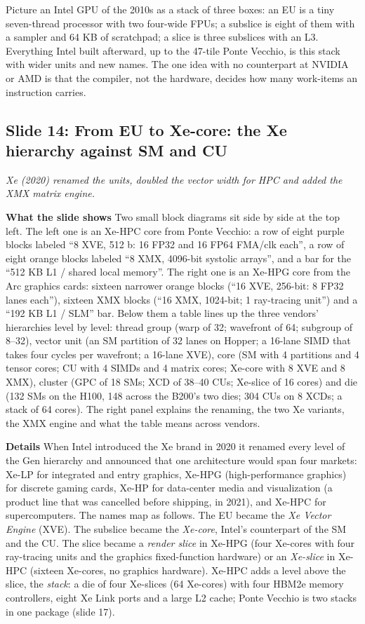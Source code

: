 \documentclass[11pt,letterpaper]{article}
\newcommand{\slide}[3]{%
  \subsection[Slide #1: #2]{Slide #1: #2}%
  {\color{muted}\itshape #3\par}\medskip}
\newcommand{\para}[1]{\medskip\noindent\textbf{#1}\quad}
\newenvironment{intuition}{\begin{tcolorbox}[intuitionbox]}{\end{tcolorbox}}
\begin{document}
\begin{intuition}
Picture an Intel GPU of the 2010s as a stack of three boxes: an EU is a tiny seven-thread processor with two four-wide FPUs; a subslice is eight of them with a sampler and 64 KB of scratchpad; a slice is three subslices with an L3. Everything Intel built afterward, up to the 47-tile Ponte Vecchio, is this stack with wider units and new names. The one idea with no counterpart at NVIDIA or AMD is that the compiler, not the hardware, decides how many work-items an instruction carries.
\end{intuition}

\slide{14}{From EU to Xe-core: the Xe hierarchy against SM and CU}{Xe (2020) renamed the units, doubled the vector width for HPC and added the XMX matrix engine.}

\para{What the slide shows} Two small block diagrams sit side by side at the top left. The left one is an Xe-HPC core from Ponte Vecchio: a row of eight purple blocks labeled ``8 XVE, 512 b: 16 FP32 and 16 FP64 FMA/clk each'', a row of eight orange blocks labeled ``8 XMX, 4096-bit systolic arrays'', and a bar for the ``512 KB L1 / shared local memory''. The right one is an Xe-HPG core from the Arc graphics cards: sixteen narrower orange blocks (``16 XVE, 256-bit: 8 FP32 lanes each''), sixteen XMX blocks (``16 XMX, 1024-bit; 1 ray-tracing unit'') and a ``192 KB L1 / SLM'' bar. Below them a table lines up the three vendors' hierarchies level by level: thread group (warp of 32; wavefront of 64; subgroup of 8--32), vector unit (an SM partition of 32 lanes on Hopper; a 16-lane SIMD that takes four cycles per wavefront; a 16-lane XVE), core (SM with 4 partitions and 4 tensor cores; CU with 4 SIMDs and 4 matrix cores; Xe-core with 8 XVE and 8 XMX), cluster (GPC of 18 SMs; XCD of 38--40 CUs; Xe-slice of 16 cores) and die (132 SMs on the H100, 148 across the B200's two dies; 304 CUs on 8 XCDs; a stack of 64 cores). The right panel explains the renaming, the two Xe variants, the XMX engine and what the table means across vendors.

\para{Details} When Intel introduced the Xe brand in 2020 it renamed every level of the Gen hierarchy and announced that one architecture would span four markets: Xe-LP for integrated and entry graphics, Xe-HPG (high-performance graphics) for discrete gaming cards, Xe-HP for data-center media and visualization (a product line that was cancelled before shipping, in 2021), and Xe-HPC for supercomputers. The names map as follows. The EU became the \emph{Xe Vector Engine} (XVE). The subslice became the \emph{Xe-core}, Intel's counterpart of the SM and the CU. The slice became a \emph{render slice} in Xe-HPG (four Xe-cores with four ray-tracing units and the graphics fixed-function hardware) or an \emph{Xe-slice} in Xe-HPC (sixteen Xe-cores, no graphics hardware). Xe-HPC adds a level above the slice, the \emph{stack}: a die of four Xe-slices (64 Xe-cores) with four HBM2e memory controllers, eight Xe Link ports and a large L2 cache; Ponte Vecchio is two stacks in one package (slide 17).
\end{document}
